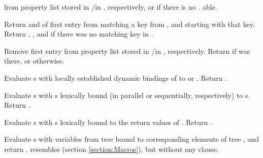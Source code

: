 \begin{LIST}{1cm}
  \label{:property_lists}
  {
     from property list stored in
    /in , respectively, or  if
    there is no . able.
  }

  {
    Return  and  of first entry from 
    matching a key from , and  starting with that key. Return \retval{\NIL},
    \retvalii{\NIL}, and  \retvaliii{\NIL} if there was no matching key
    in .
  }

  {
    Remove first entry  from property list stored in
    /in , respectively. Return \retval{\T} if 
    was there, or \retval{\NIL} otherwise.
  }

  {
    Evaluate s with locally established dynamic bindings of
     to  or \NIL. Return .
  }

  {
    Evaluate s with s lexically bound (in parallel or
    sequentially, respectively) to s. Return
    .
  }

  {
    Evaluate s with s lexically bound to the
    return values of . Return .
  }

  {
    Evaluate s with variables from tree
     bound to corresponding elements of tree
    , and return .  resembles 
    (section \ref{section:Macros}), but without any 
    clause.
  }

\end{LIST}


